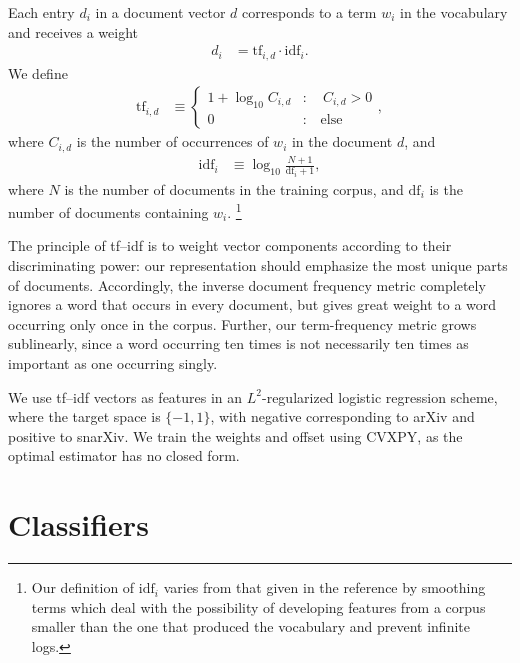 \documentclass{article}
\begin{document}
Each entry $d_i$ in a document vector $d$ corresponds to a term $w_i$ in the vocabulary and receives a weight
%
\begin{align}
  d_i &= \mathrm{tf}_{i,d} \cdot \mathrm{idf}_{i}.
\end{align}
%
We define
%
\begin{align}
  \mathrm{tf}_{i,d} &\equiv \begin{cases}
                         1 + \log_{10}C_{i,d} &:\quad C_{i,d} > 0\\
                         0 &:\quad\text{else}
                       \end{cases},
\end{align}
%
where $C_{i,d}$ is the number of occurrences of $w_i$ in the document $d$, and
%
\begin{align}
  \mathrm{idf}_i &\equiv \log_{10} \frac{N+1}{\mathrm{df}_i + 1},
\end{align}
%
where $N$ is the number of documents in the training corpus, and $\mathrm{df}_i$ is the number of documents containing $w_i$.
%
\footnote{Our definition of $\mathrm{idf}_i$ varies from that given in the reference by smoothing terms which deal with the possibility of developing features from a corpus smaller than the one that produced the vocabulary and prevent infinite logs.}

The principle of tf--idf is to weight vector components according to their discriminating power: our representation should emphasize the most unique parts of documents.
Accordingly, the inverse document frequency metric completely ignores a word that occurs in every document, but gives great weight to a word occurring only once in the corpus.
Further, our term-frequency metric grows sublinearly, since a word occurring ten times is not necessarily ten times as important as one occurring singly.

We use tf--idf vectors as features in an $L^2$-regularized logistic regression scheme, where the target space is $\{-1,1\}$, with negative corresponding to arXiv and positive to snarXiv. We train the weights and offset using CVXPY, as the optimal estimator has no closed form.









\section{Classifiers} \label{sec:classifiers}
\end{document}
